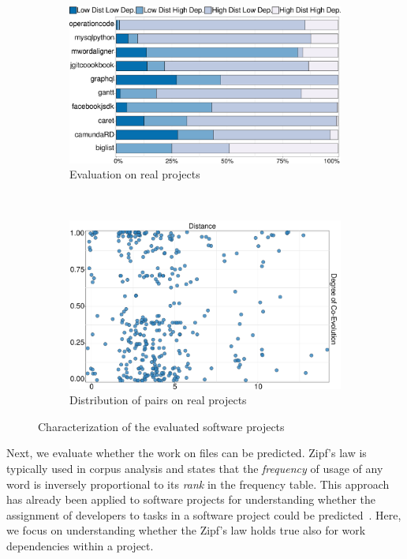 \begin{figure}[t]
	\begin{subfigure}[b]{.51\textwidth}
		\centering
		\includegraphics[width=.98\linewidth]{bpm2017/figures/Project-Analysis-Barchart-crop.pdf}
		\caption{Evaluation on real projects}
		\label{fig:project-analysis}
	\end{subfigure}~
	\begin{subfigure}[b]{.47\textwidth}
		\centering
		\includegraphics[width=.98\linewidth]{bpm2017/figures/Co-EvolutionVSDistance-OneColor.pdf}
		\caption{Distribution of pairs on real projects}
		\label{fig:pairs-on-space}
	\end{subfigure}
	\caption{Characterization of the evaluated software projects}
\end{figure}
Next, we evaluate whether the work on files can be predicted. Zipf's law is typically used in corpus analysis and states that the \emph{frequency} of usage of any word is inversely proportional to its \emph{rank} in the frequency table. This approach has already been applied to software projects for understanding whether the assignment of developers to tasks in a software project could be predicted~\cite{Canfora2006}. Here, we focus on understanding whether the Zipf's law holds true also for work dependencies within a project. 

